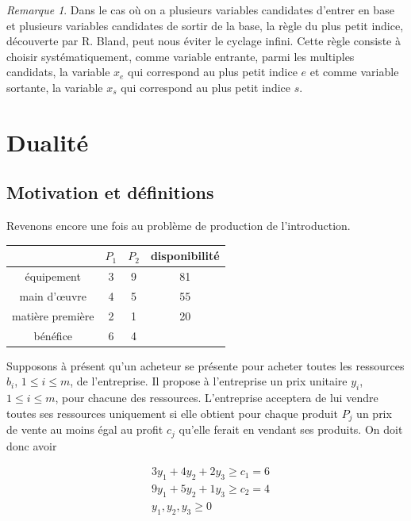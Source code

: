 \documentclass[a4paper,12pt,openany]{book}
\theoremstyle{plain}
\theoremstyle{definition}
\theoremstyle{remark}
\newtheorem{remarque}[theorem]{Remarque}
\theoremstyle{nbstyle}
\begin{document}
	\begin{remarque}
		Dans le cas où on a plusieurs variables candidates d'entrer en base et plusieurs variables candidates de sortir de la base, la règle du plus petit indice, découverte par R. Bland, peut nous éviter le cyclage infini. Cette règle consiste à choisir systématiquement, comme variable entrante, parmi les multiples candidats, la variable $x_{e}$ qui correspond au plus petit indice $e$ et comme variable sortante, la variable $x_{s}$ qui correspond au plus petit indice $s$.
	\end{remarque}	
	
	
	
	
	
	\chapter{Dualité}
	
	\section{Motivation et définitions}
	
	Revenons encore une fois au problème de production de l'introduction.
	
	\begin{center}
		\begin{tabular}{|c|c|c|c|}
			\hline
			& $P_{1}$ & $P_{2}$ & disponibilité \\
			\hline
			équipement & 3 & 9 & 81 \\
			main d'œuvre & 4 & 5 & 55 \\
			matière première & 2 & 1 & 20 \\
			bénéfice & 6 & 4 &  \\
			\hline
		\end{tabular}
	\end{center}
	
	Supposons à présent qu'un acheteur se présente pour acheter toutes les ressources $b_{i}$, $1 \leq i \leq m$, de l'entreprise. Il propose à l'entreprise un prix unitaire $y_{i}$, $1 \leq i \leq m$, pour chacune des ressources. L'entreprise acceptera de lui vendre toutes ses ressources uniquement si elle obtient pour chaque produit $P_{j}$ un prix de vente au moins égal au profit $c_{j}$ qu'elle ferait en vendant ses produits. On doit donc avoir
	
	\[
	\begin{aligned}
	& 3 y_{1}+4 y_{2}+2 y_{3} \geq c_{1}=6 \\
	& 9 y_{1}+5 y_{2}+1 y_{3} \geq c_{2}=4 \\
	& y_{1}, y_{2}, y_{3} \geq 0
	\end{aligned}
	\]
	
\end{document}
